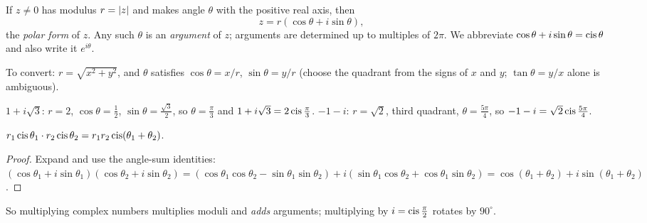 \begin{center}
\end{center}

\begin{definition}
If $z \ne 0$ has modulus $r = \left\lvert z \right\rvert$ and makes angle $\theta$ with the positive real axis,
then
\[ z = r(\cos\theta + i\sin\theta), \]
the \emph{polar form} of $z$. Any such $\theta$ is an \emph{argument} of $z$; arguments are
determined up to multiples of $2\pi$. We abbreviate $\cos\theta + i\sin\theta = \operatorname{cis}\theta$
and also write it $e^{i\theta}$.
\end{definition}

To convert: $r = \sqrt{x^2+y^2}$, and $\theta$ satisfies $\cos\theta = x/r$, $\sin\theta = y/r$
(choose the quadrant from the signs of $x$ and $y$; $\tan\theta = y/x$ alone is ambiguous).

\begin{example}
$1 + i\sqrt3$: $r = 2$, $\cos\theta = \frac12$, $\sin\theta = \frac{\sqrt3}2$, so
$\theta = \frac\pi3$ and $1 + i\sqrt 3 = 2\operatorname{cis}\frac\pi3$.
$-1 - i$: $r = \sqrt2$, third quadrant, $\theta = \frac{5\pi}{4}$, so $-1 - i = \sqrt2\operatorname{cis}\frac{5\pi}4$.
\end{example}

\begin{theorem}
$r_1\operatorname{cis}\theta_1\cdot r_2\operatorname{cis}\theta_2 = r_1r_2\operatorname{cis}(\theta_1 + \theta_2)$.
\end{theorem}
\begin{proof}
Expand and use the angle-sum identities:
$(\cos\theta_1 + i\sin\theta_1)(\cos\theta_2 + i\sin\theta_2) = (\cos\theta_1\cos\theta_2 -
\sin\theta_1\sin\theta_2) + i(\sin\theta_1\cos\theta_2 + \cos\theta_1\sin\theta_2) =
\cos(\theta_1+\theta_2) + i\sin(\theta_1 + \theta_2)$.
\end{proof}

So multiplying complex numbers multiplies moduli and \emph{adds} arguments; multiplying by
$i = \operatorname{cis}\frac\pi2$ rotates by $90^\circ$.

